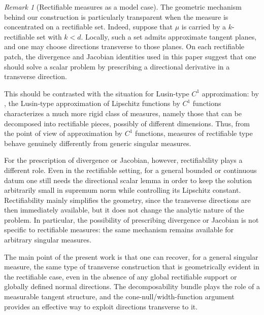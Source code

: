 \documentclass[11pt,a4paper]{article}
\theoremstyle{definition}
\theoremstyle{remark}
\newtheorem{rem}[thm]{Remark}
\begin{document}
\begin{rem}[Rectifiable measures as a model case]
The geometric mechanism behind our construction is particularly transparent when the measure is concentrated on a rectifiable set.
Indeed, suppose that $\mu$ is carried by a $k$-rectifiable set with $k<d$.
Locally, such a set admits approximate tangent planes, and one may choose directions transverse to those planes.
On each rectifiable patch, the divergence and Jacobian identities used in this paper suggest that one should solve a scalar problem by prescribing a directional derivative in a transverse direction.

This should be contrasted with the situation for Lusin-type $C^1$ approximation:
by \cite{MMrect}, the Lusin-type approximation of Lipschitz functions by $C^1$ functions characterizes a much more rigid class of measures, namely those that can be decomposed into rectifiable pieces, possibly of different dimensions.
Thus, from the point of view of approximation by $C^1$ functions, measures of rectifiable type behave genuinely differently from generic singular measures.

For the prescription of divergence or Jacobian, however, rectifiability plays a different role.
Even in the rectifiable setting, for a general bounded or continuous datum one still needs the directional scalar lemma in order to keep the solution arbitrarily small in supremum norm while controlling its Lipschitz constant.
Rectifiability mainly simplifies the geometry, since the transverse directions are then immediately available, but it does not change the analytic nature of the problem.
In particular, the possibility of prescribing divergence or Jacobian is not specific to rectifiable measures: the same mechanism remains available for arbitrary singular measures.

The main point of the present work is that one can recover, for a general singular measure, the same type of transverse construction that is geometrically evident in the rectifiable case, even in the absence of any global rectifiable support or globally defined normal directions.
The decomposability bundle plays the role of a measurable tangent structure, and the cone-null/width-function argument provides an effective way to exploit directions transverse to it.
\end{rem}
\end{document}
